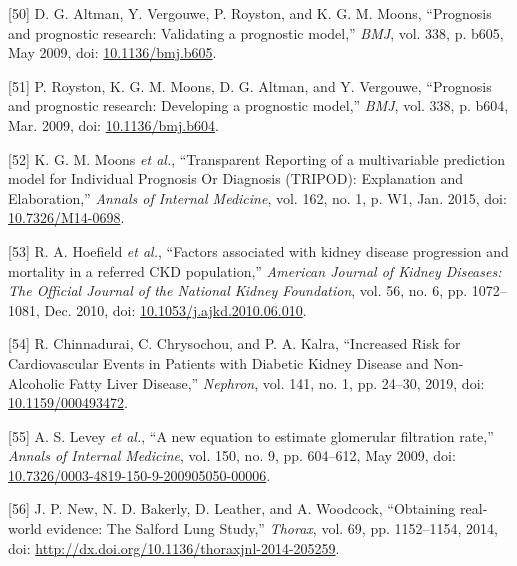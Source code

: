 \documentclass[
]{article}
\newenvironment{cslreferences}%
  {}%
  {\par}
\begin{document}
\begin{cslreferences}
\leavevmode\hypertarget{ref-altman_prognosis_2009}{}%
{[}50{]} D. G. Altman, Y. Vergouwe, P. Royston, and K. G. M. Moons, ``Prognosis and prognostic research: Validating a prognostic model,'' \emph{BMJ}, vol. 338, p. b605, May 2009, doi: \href{https://doi.org/10.1136/bmj.b605}{10.1136/bmj.b605}.

\leavevmode\hypertarget{ref-royston_prognosis_2009}{}%
{[}51{]} P. Royston, K. G. M. Moons, D. G. Altman, and Y. Vergouwe, ``Prognosis and prognostic research: Developing a prognostic model,'' \emph{BMJ}, vol. 338, p. b604, Mar. 2009, doi: \href{https://doi.org/10.1136/bmj.b604}{10.1136/bmj.b604}.

\leavevmode\hypertarget{ref-moons_transparent_2015}{}%
{[}52{]} K. G. M. Moons \emph{et al.}, ``Transparent Reporting of a multivariable prediction model for Individual Prognosis Or Diagnosis (TRIPOD): Explanation and Elaboration,'' \emph{Annals of Internal Medicine}, vol. 162, no. 1, p. W1, Jan. 2015, doi: \href{https://doi.org/10.7326/M14-0698}{10.7326/M14-0698}.

\leavevmode\hypertarget{ref-hoefield_factors_2010}{}%
{[}53{]} R. A. Hoefield \emph{et al.}, ``Factors associated with kidney disease progression and mortality in a referred CKD population,'' \emph{American Journal of Kidney Diseases: The Official Journal of the National Kidney Foundation}, vol. 56, no. 6, pp. 1072--1081, Dec. 2010, doi: \href{https://doi.org/10.1053/j.ajkd.2010.06.010}{10.1053/j.ajkd.2010.06.010}.

\leavevmode\hypertarget{ref-chinnadurai_increased_2019-1}{}%
{[}54{]} R. Chinnadurai, C. Chrysochou, and P. A. Kalra, ``Increased Risk for Cardiovascular Events in Patients with Diabetic Kidney Disease and Non-Alcoholic Fatty Liver Disease,'' \emph{Nephron}, vol. 141, no. 1, pp. 24--30, 2019, doi: \href{https://doi.org/10.1159/000493472}{10.1159/000493472}.

\leavevmode\hypertarget{ref-levey_new_2009}{}%
{[}55{]} A. S. Levey \emph{et al.}, ``A new equation to estimate glomerular filtration rate,'' \emph{Annals of Internal Medicine}, vol. 150, no. 9, pp. 604--612, May 2009, doi: \href{https://doi.org/10.7326/0003-4819-150-9-200905050-00006}{10.7326/0003-4819-150-9-200905050-00006}.

\leavevmode\hypertarget{ref-new_obtaining_2014}{}%
{[}56{]} J. P. New, N. D. Bakerly, D. Leather, and A. Woodcock, ``Obtaining real-world evidence: The Salford Lung Study,'' \emph{Thorax}, vol. 69, pp. 1152--1154, 2014, doi: \href{https://doi.org/http://dx.doi.org/10.1136/thoraxjnl-2014-205259}{http://dx.doi.org/10.1136/thoraxjnl-2014-205259}.


\end{cslreferences}
\end{document}
